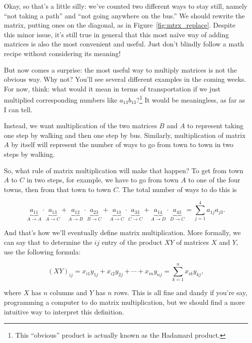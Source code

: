 \documentclass[../textbook.tex]{subfiles}
\begin{document}
\noindent Okay, so that's a little silly: we've counted two different ways to stay still, namely ``not taking a path'' and ``not going anywhere on the bus.'' We should rewrite the matrix, putting ones on the diagonal, as in Figure~\ref{fig:mtrx_replace}. Despite this minor issue, it's still true in general that this most naïve way of adding matrices is also the most convenient and useful. Just don't blindly follow a math recipe without considering its meaning!


But now comes a surprise: the most useful way to multiply matrices is not the obvious way. Why not? You'll see several different examples in the coming weeks. For now, think: what would it mean in terms of transportation if we just multiplied corresponding numbers like $a_{13}b_{13}$?\footnote{This ``obvious'' product is actually known as the Hadamard product.} It would be meaningless, as far as I can tell.

Instead, we want multiplication of the two matrices $B$ and $A$ to represent taking one step by walking and then one step by bus. Similarly, multiplication of matrix $A$ by itself will represent the number of ways to go from town to town in two steps by walking.

So, what rule of matrix multiplication will make that happen? To get from town $A$ to $C$ in two steps, for example, we have to go from town $A$ to one of the four towns, then from that town to town $C$. The total number of ways to do this is

$$\underbrace{a_{11}}_{A\to A}\cdot \underbrace{a_{13}}_{A\to C}+\underbrace{a_{12}}_{A\to B}\cdot \underbrace{a_{23}}_{B\to C}+\underbrace{a_{13}}_{A\to C}\cdot \underbrace{a_{33}}_{C\to C}+\underbrace{a_{14}}_{A\to D}\cdot \underbrace{a_{43}}_{D\to C}=\sum_{j=1}^{4}a_{1j}a_{j3}.$$

\noindent And that's how we'll eventually define matrix multiplication. More formally, we can say that to determine the $ij$ entry of the product $XY$ of matrices $X$ and $Y$, use the following formula:

$$(XY)_{ij}=x_{i1}y_{1j}+x_{i2}y_{2j}+\cdots + x_{in}y_{nj} = \sum_{k=1}^n x_{ik} y_{kj},$$

\noindent where $X$ has $n$ columns and $Y$ has $n$ rows. This is all fine and dandy if you're say, programming a computer to do matrix multiplication, but we should find a more intuitive way to interpret this definition.
\end{document}
